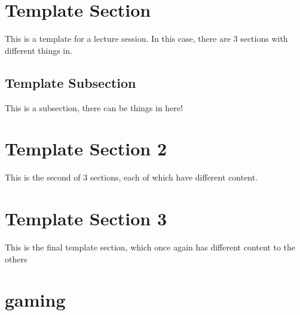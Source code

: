
\section*{Template Section}

This is a template for a lecture session.
In this case, there are 3 sections with different things in.

\subsection*{Template Subsection}

This is a subsection, there can be things in here!

\section*{Template Section 2}

This is the second of 3 sections, each of which have different content.

\section*{Template Section 3}

This is the final template section, which once again has different content to the others

\pagebreak

\section*{gaming}